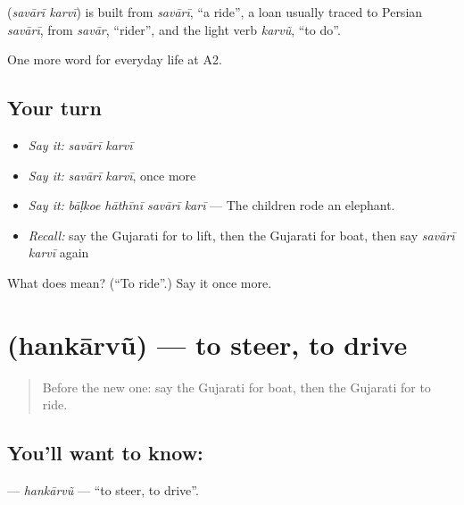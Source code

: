 \begin{cousinweb}
\textbf{ } (\emph{savārī karvī}) is built from \emph{savārī}, \textquotedblleft{}a ride\textquotedblright{}, a loan usually traced to Persian \emph{savārī}, from \emph{savār}, \textquotedblleft{}rider\textquotedblright{}, and the light verb \emph{karvũ}, \textquotedblleft{}to do\textquotedblright{}.
\end{cousinweb}

\begin{grammarlens}[title={What you've built}]
One more word for everyday life at A2.
\end{grammarlens}

\subsection*{Your turn}
\begin{itemize}
\raggedright
  \item \emph{Say it:} \emph{savārī karvī}
  \item \emph{Say it:} \emph{savārī karvī}, once more
  \item \emph{Say it:} \emph{bāḷkoe hāthīnī savārī karī} — The children rode an elephant.
  \item \emph{Recall:} say the Gujarati for to lift, then the Gujarati for boat, then say \emph{savārī karvī} again
\end{itemize}

\begin{tcolorbox}[breakable,colback=teal!4,colframe=teal!35!black,title={Before you move on}]
What does   mean? (\textquotedblleft{}To ride\textquotedblright{}.) Say it once more.
\end{tcolorbox}
\section[\texorpdfstring{\gu{હંકારવું} (hankārvũ)}{હંકારવું (hankārvũ)}]{ (hankārvũ) — to steer, to drive}

\label{lesson:GU-C211-hankarvu}



\begin{quote}
Before the new one: say the Gujarati for boat, then the Gujarati for to ride.
\end{quote}

\subsection*{You'll want to know: }
\textbf{} — \emph{hankārvũ} — \textquotedblleft{}to steer, to drive\textquotedblright{}.

